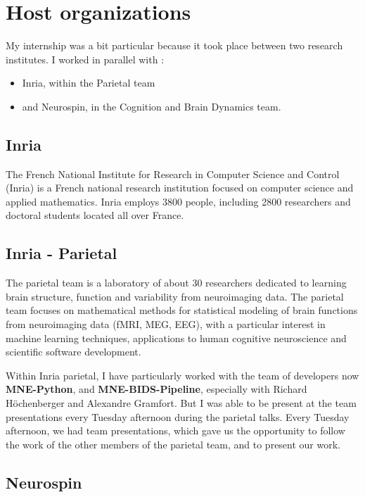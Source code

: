 
\chapter*{Host organizations}

My internship was a bit particular because it took place between two research institutes. I worked in parallel with :
\begin{itemize}
 \item Inria, within the Parietal team
 \item and Neurospin, in the Cognition and Brain Dynamics team.
\end{itemize} 

\section*{Inria}
The French National Institute for Research in Computer Science and Control (Inria) is a French national research institution focused on computer science and applied mathematics. Inria employs 3800 people, including 2800 researchers and doctoral students located all over France.

\section*{Inria - Parietal}

The parietal team is a laboratory of about 30 researchers dedicated to learning brain structure, function and variability from neuroimaging data. The parietal team focuses on mathematical methods for statistical modeling of brain functions from neuroimaging data (fMRI, MEG, EEG), with a particular interest in machine learning techniques, applications to human cognitive neuroscience and scientific software development.

Within Inria parietal, I have particularly worked with the team of developers now \textbf{MNE-Python}, and \textbf{MNE-BIDS-Pipeline}, especially with Richard Höchenberger and Alexandre Gramfort. But I was able to be present at the team presentations every Tuesday afternoon during the parietal talks. Every Tuesday afternoon, we had team presentations, which gave us the opportunity to follow the work of the other members of the parietal team, and to present our work.

\section*{Neurospin}

